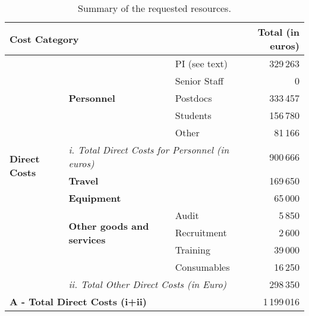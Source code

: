 


\begin{table}[!htb]
\setlength{\extrarowheight}{2pt}
  \centering
  \caption{Summary of the requested resources.}
  \label{tab:resources}
  \begin{tabular}{|l|l|l|r|}\hline
    \multicolumn{3}{|l|}{\bfseries Cost Category} & {\bfseries Total (in euros)} \\ \hline
    \multirow{12}{*}{\bfseries Direct Costs} & \multirow{5}{*}{\bfseries Personnel} & PI (see text) & 329\,263  \\ \cline{3-4}
                                       &                                & Senior Staff & 0 \\ \cline{3-4}
                                       &                                & Postdocs     &  333\,457 \\ \cline{3-4}
                                       &                                & Students     &  156\,780 \\ \cline{3-4}
                                       &                                & Other        &  81\,166  \\ \cline{2-4}
                                       & \multicolumn{2}{|l|}{\itshape i. Total Direct Costs for Personnel (in euros)} & 900\,666 \\\cline{2-4}
                                       & \multicolumn{2}{|l|}{\bfseries Travel} &  169\,650 \\\cline{2-4}
                                       & \multicolumn{2}{|l|}{\bfseries Equipment} &  65\,000  \\\cline{2-4}
                                       & \multirow{3}{*}{\bfseries Other goods and services} & Audit              &  5\,850 \\\cline{3-4}
                                       &                                & Recruitment        &   2\,600   \\\cline{3-4}
                                       &                                & Training        &   39\,000   \\\cline{3-4}
                                       &                                & Consumables        &   16\,250   \\\cline{3-4}
                                       & \multicolumn{2}{|l|}{\itshape ii. Total Other Direct Costs (in Euro)} & 298\,350 \\ \hline
    \multicolumn{3}{|l|}{{\bfseries A - Total Direct Costs (i+ii)}}  & 1\,199\,016 \\ \hline

\end{tabular}
\end{table}
